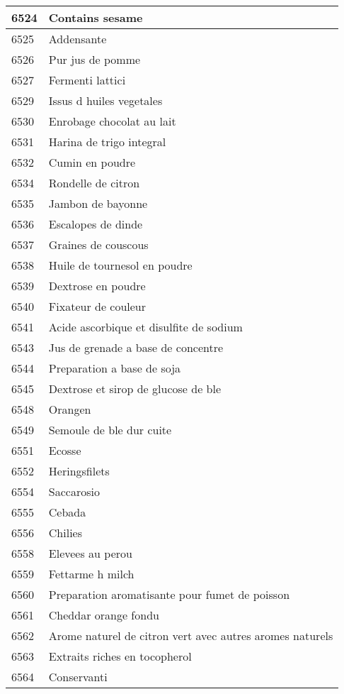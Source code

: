 \begin{longtable}{|l|l|}
6524 & Contains sesame \\ \hline 
6525 & Addensante \\ \hline 
6526 & Pur jus de pomme \\ \hline 
6527 & Fermenti lattici \\ \hline 
6529 & Issus d huiles vegetales \\ \hline 
6530 & Enrobage chocolat au lait \\ \hline 
6531 & Harina de trigo integral \\ \hline 
6532 & Cumin en poudre \\ \hline 
6534 & Rondelle de citron \\ \hline 
6535 & Jambon de bayonne \\ \hline 
6536 & Escalopes de dinde \\ \hline 
6537 & Graines de couscous \\ \hline 
6538 & Huile de tournesol en poudre \\ \hline 
6539 & Dextrose en poudre \\ \hline 
6540 & Fixateur de couleur \\ \hline 
6541 & Acide ascorbique et disulfite de sodium \\ \hline 
6543 & Jus de grenade a base de concentre \\ \hline 
6544 & Preparation a base de soja \\ \hline 
6545 & Dextrose et sirop de glucose de ble \\ \hline 
6548 & Orangen \\ \hline 
6549 & Semoule de ble dur cuite \\ \hline 
6551 & Ecosse \\ \hline 
6552 & Heringsfilets \\ \hline 
6554 & Saccarosio \\ \hline 
6555 & Cebada \\ \hline 
6556 & Chilies \\ \hline 
6558 & Elevees au perou \\ \hline 
6559 & Fettarme h milch \\ \hline 
6560 & Preparation aromatisante pour fumet de poisson \\ \hline 
6561 & Cheddar orange fondu \\ \hline 
6562 & Arome naturel de citron vert avec autres aromes naturels \\ \hline 
6563 & Extraits riches en tocopherol \\ \hline 
6564 & Conservanti \\ \hline 

\end{longtable}
